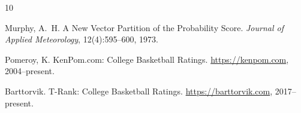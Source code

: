 \documentclass[11pt,a4paper]{article}
\begin{document}

\begin{thebibliography}{10}

Murphy, A.~H.
\newblock A New Vector Partition of the Probability Score.
\newblock \emph{Journal of Applied Meteorology}, 12(4):595--600, 1973.

Pomeroy, K.
\newblock KenPom.com: College Basketball Ratings.
\newblock \url{https://kenpom.com}, 2004--present.

Barttorvik.
\newblock T-Rank: College Basketball Ratings.
\newblock \url{https://barttorvik.com}, 2017--present.

\end{thebibliography}
\end{document}
